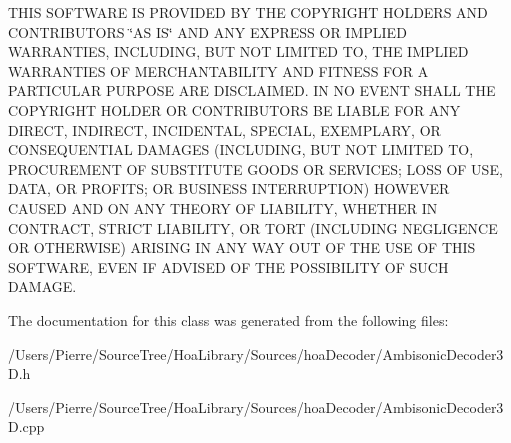 T\-H\-I\-S S\-O\-F\-T\-W\-A\-R\-E I\-S P\-R\-O\-V\-I\-D\-E\-D B\-Y T\-H\-E C\-O\-P\-Y\-R\-I\-G\-H\-T H\-O\-L\-D\-E\-R\-S A\-N\-D C\-O\-N\-T\-R\-I\-B\-U\-T\-O\-R\-S \char`\"{}\-A\-S I\-S\char`\"{} A\-N\-D A\-N\-Y E\-X\-P\-R\-E\-S\-S O\-R I\-M\-P\-L\-I\-E\-D W\-A\-R\-R\-A\-N\-T\-I\-E\-S, I\-N\-C\-L\-U\-D\-I\-N\-G, B\-U\-T N\-O\-T L\-I\-M\-I\-T\-E\-D T\-O, T\-H\-E I\-M\-P\-L\-I\-E\-D W\-A\-R\-R\-A\-N\-T\-I\-E\-S O\-F M\-E\-R\-C\-H\-A\-N\-T\-A\-B\-I\-L\-I\-T\-Y A\-N\-D F\-I\-T\-N\-E\-S\-S F\-O\-R A P\-A\-R\-T\-I\-C\-U\-L\-A\-R P\-U\-R\-P\-O\-S\-E A\-R\-E D\-I\-S\-C\-L\-A\-I\-M\-E\-D. I\-N N\-O E\-V\-E\-N\-T S\-H\-A\-L\-L T\-H\-E C\-O\-P\-Y\-R\-I\-G\-H\-T H\-O\-L\-D\-E\-R O\-R C\-O\-N\-T\-R\-I\-B\-U\-T\-O\-R\-S B\-E L\-I\-A\-B\-L\-E F\-O\-R A\-N\-Y D\-I\-R\-E\-C\-T, I\-N\-D\-I\-R\-E\-C\-T, I\-N\-C\-I\-D\-E\-N\-T\-A\-L, S\-P\-E\-C\-I\-A\-L, E\-X\-E\-M\-P\-L\-A\-R\-Y, O\-R C\-O\-N\-S\-E\-Q\-U\-E\-N\-T\-I\-A\-L D\-A\-M\-A\-G\-E\-S (I\-N\-C\-L\-U\-D\-I\-N\-G, B\-U\-T N\-O\-T L\-I\-M\-I\-T\-E\-D T\-O, P\-R\-O\-C\-U\-R\-E\-M\-E\-N\-T O\-F S\-U\-B\-S\-T\-I\-T\-U\-T\-E G\-O\-O\-D\-S O\-R S\-E\-R\-V\-I\-C\-E\-S; L\-O\-S\-S O\-F U\-S\-E, D\-A\-T\-A, O\-R P\-R\-O\-F\-I\-T\-S; O\-R B\-U\-S\-I\-N\-E\-S\-S I\-N\-T\-E\-R\-R\-U\-P\-T\-I\-O\-N) H\-O\-W\-E\-V\-E\-R C\-A\-U\-S\-E\-D A\-N\-D O\-N A\-N\-Y T\-H\-E\-O\-R\-Y O\-F L\-I\-A\-B\-I\-L\-I\-T\-Y, W\-H\-E\-T\-H\-E\-R I\-N C\-O\-N\-T\-R\-A\-C\-T, S\-T\-R\-I\-C\-T L\-I\-A\-B\-I\-L\-I\-T\-Y, O\-R T\-O\-R\-T (I\-N\-C\-L\-U\-D\-I\-N\-G N\-E\-G\-L\-I\-G\-E\-N\-C\-E O\-R O\-T\-H\-E\-R\-W\-I\-S\-E) A\-R\-I\-S\-I\-N\-G I\-N A\-N\-Y W\-A\-Y O\-U\-T O\-F T\-H\-E U\-S\-E O\-F T\-H\-I\-S S\-O\-F\-T\-W\-A\-R\-E, E\-V\-E\-N I\-F A\-D\-V\-I\-S\-E\-D O\-F T\-H\-E P\-O\-S\-S\-I\-B\-I\-L\-I\-T\-Y O\-F S\-U\-C\-H D\-A\-M\-A\-G\-E. 

The documentation for this class was generated from the following files\-:\begin{DoxyCompactItemize}
\item 
/\-Users/\-Pierre/\-Source\-Tree/\-Hoa\-Library/\-Sources/hoa\-Decoder/Ambisonic\-Decoder3\-D.\-h\item 
/\-Users/\-Pierre/\-Source\-Tree/\-Hoa\-Library/\-Sources/hoa\-Decoder/Ambisonic\-Decoder3\-D.\-cpp\end{DoxyCompactItemize}

